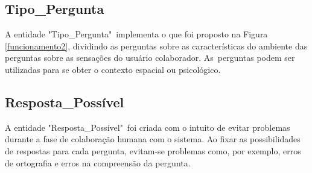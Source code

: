 \subsection{Tipo\_Pergunta}
A entidade "Tipo\_Pergunta"\ implementa o que foi proposto na Figura \ref{funcionamento2}, dividindo as perguntas sobre as características do ambiente das perguntas sobre as sensações do usuário colaborador. As\ perguntas podem ser utilizadas para se obter o contexto espacial ou psicológico.
\begin{center}
\label{tabelaDTipoPergunta}
\begin{table}[h!]
\end{table}
\end{center}
\subsection{Resposta\_Possível}
A entidade "Resposta\_Possível"\ foi criada com o intuito de evitar problemas durante a fase de colaboração humana com o sistema. Ao fixar as possibilidades de respostas para cada pergunta, evitam-se problemas como, por exemplo, erros de ortografia e erros na compreensão da pergunta.
\begin{center}
\label{tabelaDRespostaPossivel}
\begin{table}[h!]
\end{table}
\end{center}
